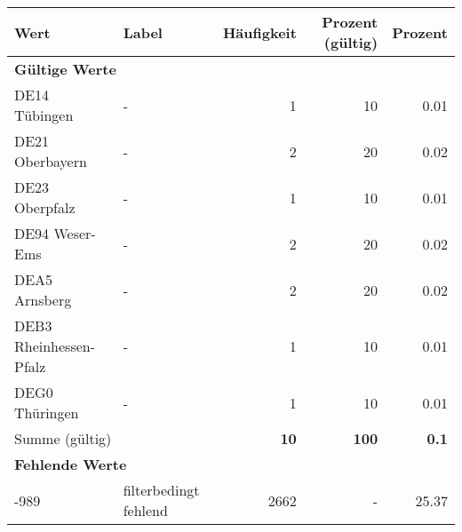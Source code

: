      \begin{longtable}{Xlrrr}
     \toprule
     \textbf{Wert} & \textbf{Label} & \textbf{Häufigkeit} & \textbf{Prozent (gültig)} & \textbf{Prozent} \\
     \endhead
     \midrule
     \multicolumn{5}{l}{\textbf{Gültige Werte}}\\

     \multicolumn{1}{X}{DE14 Tübingen} &
     - &
     \num{1} &
     \num[round-mode=places,round-precision=2]{10} &
     \num[round-mode=places,round-precision=2]{0.01} \\

     \multicolumn{1}{X}{DE21 Oberbayern} &
     - &
     \num{2} &
     \num[round-mode=places,round-precision=2]{20} &
     \num[round-mode=places,round-precision=2]{0.02} \\

     \multicolumn{1}{X}{DE23 Oberpfalz} &
     - &
     \num{1} &
     \num[round-mode=places,round-precision=2]{10} &
     \num[round-mode=places,round-precision=2]{0.01} \\

     \multicolumn{1}{X}{DE94 Weser-Ems} &
     - &
     \num{2} &
     \num[round-mode=places,round-precision=2]{20} &
     \num[round-mode=places,round-precision=2]{0.02} \\

     \multicolumn{1}{X}{DEA5 Arnsberg} &
     - &
     \num{2} &
     \num[round-mode=places,round-precision=2]{20} &
     \num[round-mode=places,round-precision=2]{0.02} \\

     \multicolumn{1}{X}{DEB3 Rheinhessen-Pfalz} &
     - &
     \num{1} &
     \num[round-mode=places,round-precision=2]{10} &
     \num[round-mode=places,round-precision=2]{0.01} \\

     \multicolumn{1}{X}{DEG0 Thüringen} &
     - &
     \num{1} &
     \num[round-mode=places,round-precision=2]{10} &
     \num[round-mode=places,round-precision=2]{0.01} \\
     \midrule
      \multicolumn{2}{l}{Summe (gültig)} & \textbf{\num{10}} &
      \textbf{\num{100}} &
         \textbf{\num[round-mode=places,round-precision=2]{0.1}} \\
     \multicolumn{5}{l}{\textbf{Fehlende Werte}}\\
       -989 & filterbedingt fehlend & \num{2662} & - & \num[round-mode=places,round-precision=2]{25.37} \\


\end{longtable}
